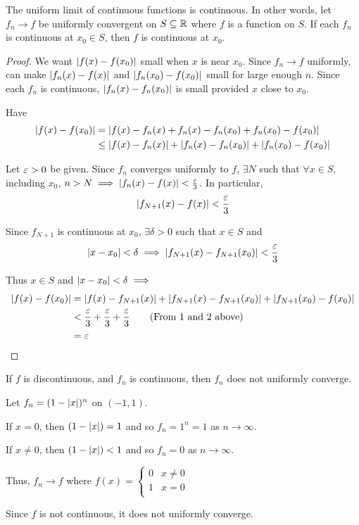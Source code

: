 \documentclass{article}
\begin{document}
\begin{cthm}[Theorem 24.3]
  The uniform limit of continuous functions is continuous. In other words, let $f_n \to f$ be uniformly convergent on $S \subseteq \mathbb{R}$ where $f$ is a function on $S$. If each $f_n$ is continuous at $x_0 \in S$, then $f$ is continuous at $x_0$.
\end{cthm}
\begin{proof}
  We want $\abs{f(x) - f(x_0)}$ small when $x$ is near $x_0$. Since $f_n \to f$ uniformly, can make $\abs{f_n(x) - f(x)}$ and $\abs{f_n(x_0) - f(x_0)}$ small for large enough $n$. Since each $f_n$ is continuous, $\abs{f_n(x) - f_n(x_0)}$ is small provided $x$ close to $x_0$.

  Have
  \begin{align*}
    \abs{f(x) - f(x_0)} &= \abs{f(x) - f_n(x) + f_n(x) - f_n(x_0) + f_n(x_0) - f(x_0)}\\
    &\leq \abs{f(x) - f_n(x)} + \abs{f_n(x) - f_n(x_0)} + \abs{f_n(x_0) - f(x_0)}\\
  \end{align*}

  Let $\varepsilon > 0$ be given. Since $f_n$ converges uniformly to $f$, $\exists N$ such that $\forall x \in S$, including $x_0$, $n > N \implies \abs{f_n(x) - f(x)} < \frac{\varepsilon}{3}$. In particular,
  \begin{equation}
    \abs{f_{N+1}(x) - f(x)} < \frac{\varepsilon}{3}
  \end{equation}

  Since $f_{N+1}$ is continuous at $x_0$, $\exists \delta > 0$ such that $x \in S$ and
  \begin{equation}
    \abs{x - x_0} < \delta \implies \abs{f_{N+1}(x) - f_{N+1}(x_0)} < \frac{\varepsilon}{3}
  \end{equation}

  Thus $x \in S$ and $\abs{x-x_0} < \delta \implies$
  \begin{align*}
    \abs{f(x) - f(x_0)} &= \abs{f(x) - f_{N+1}(x)} + \abs{f_{N+1}(x) - f_{N+1}(x_0)} + \abs{f_{N+1}(x_0) - f(x_0)}\\
    &< \frac{\varepsilon}{3} + \frac{\varepsilon}{3} + \frac{\varepsilon}{3} \tag{From 1 and 2 above}\\
    &= \varepsilon
  \end{align*}
\end{proof}
\begin{corollary}
  If $f$ is discontinuous, and $f_n$ is continuous, then $f_n$ does not uniformly converge.
\end{corollary}
\begin{example}
  Let $f_n = (1 - \abs{x})^n$ on $(-1, 1)$.\

  If $x = 0$, then $(1 - \abs{x}) = 1$ and so $f_n = 1^n = 1$ as $n \to \infty$.

  If $x \neq 0$, then $(1 - \abs{x}) < 1$ and so $f_n = 0$ as $n \to \infty$.

  Thus, $f_n \to f$ where $f(x) =
  \begin{cases}
    0 & x \neq 0\\
    1 & x = 0\\
  \end{cases}$

  Since $f$ is not continuous, it does not uniformly converge.
\end{example}
\end{document}
